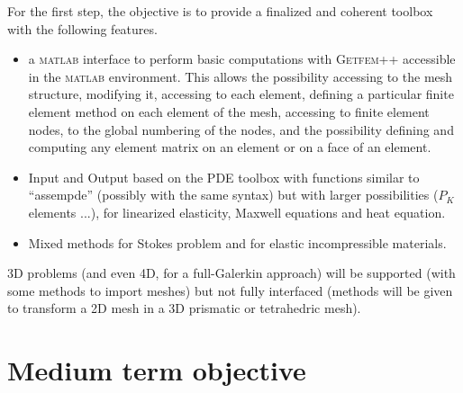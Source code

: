 \documentclass[11pt,a4paper]{article}
\begin{document}
For the first step, the objective is to provide a finalized and coherent
toolbox with the following features.
\begin{itemize}
\item  a \textsc{matlab} interface to perform basic computations with 
\textsc{Getfem++}  accessible in the \textsc{matlab} environment. This
allows the possibility accessing to the mesh structure, modifying it,
accessing to each element, defining a particular finite element method on
each element of the mesh, accessing to finite element nodes, to the global
numbering of the nodes, and the possibility defining and computing any
element matrix on an element or on a face of an element.

\item  Input and Output based on the PDE toolbox with functions similar to
``assempde'' (possibly with the same syntax) but with larger possibilities ($%
P_{K}$ elements ...), for linearized elasticity, Maxwell equations and heat
equation.

\item  Mixed methods for Stokes problem and for elastic incompressible
materials.
\end{itemize}

3D problems (and even 4D, for a full-Galerkin approach) will be supported
(with some methods to import meshes) but not fully interfaced (methods will
be given to transform a 2D mesh in a 3D prismatic or tetrahedric mesh).

\section{Medium term objective}
\end{document}
